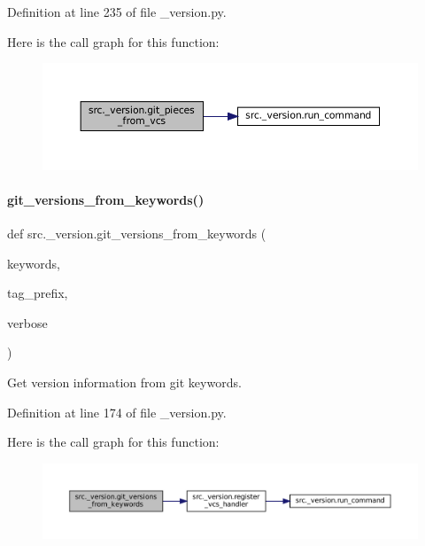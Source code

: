 Definition at line 235 of file \+\_\+version.\+py.

Here is the call graph for this function\+:
\nopagebreak
\begin{figure}[H]
\begin{center}
\leavevmode
\includegraphics[width=350pt]{namespacesrc_1_1__version_a7f961ca0bf593256fdbc850f707dadca_cgraph}
\end{center}
\end{figure}
\mbox{\label{namespacesrc_1_1__version_af7c030b0c688642e46d34ee86979d5b1}} 
\paragraph{\texorpdfstring{git\+\_\+versions\+\_\+from\+\_\+keywords()}{git\_versions\_from\_keywords()}}
{\footnotesize\ttfamily def src.\+\_\+version.\+git\+\_\+versions\+\_\+from\+\_\+keywords (\begin{DoxyParamCaption}\item[{}]{keywords,  }\item[{}]{tag\+\_\+prefix,  }\item[{}]{verbose }\end{DoxyParamCaption})}



Get version information from git keywords. 



Definition at line 174 of file \+\_\+version.\+py.

Here is the call graph for this function\+:
\nopagebreak
\begin{figure}[H]
\begin{center}
\leavevmode
\includegraphics[width=350pt]{namespacesrc_1_1__version_af7c030b0c688642e46d34ee86979d5b1_cgraph}
\end{center}
\end{figure}
\mbox{\label{namespacesrc_1_1__version_a21c3be02b22ff9893ddf1de4b4609066}} 
